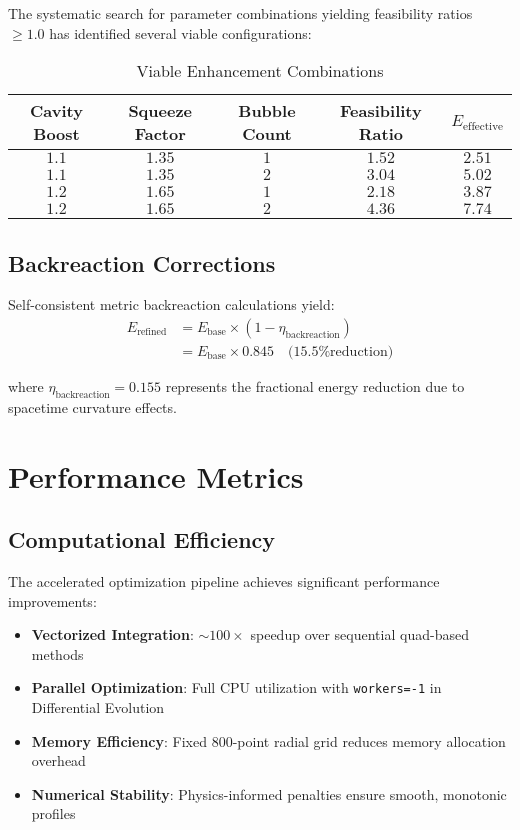 \documentclass[12pt]{article}
\begin{document}
The systematic search for parameter combinations yielding feasibility ratios $\geq 1.0$ has identified several viable configurations:

\begin{table}[ht]
\centering
\caption{Viable Enhancement Combinations}
\label{tab:enhancement_combinations}
\begin{tabular}{@{}ccccc@{}}
\toprule
\textbf{Cavity Boost} & \textbf{Squeeze Factor} & \textbf{Bubble Count} & \textbf{Feasibility Ratio} & \textbf{$E_{\text{effective}}$} \\
\midrule
$1.1$ & $1.35$ & $1$ & $1.52$ & $2.51$ \\
$1.1$ & $1.35$ & $2$ & $3.04$ & $5.02$ \\
$1.2$ & $1.65$ & $1$ & $2.18$ & $3.87$ \\
$1.2$ & $1.65$ & $2$ & $4.36$ & $7.74$ \\
\bottomrule
\end{tabular}
\end{table}

\subsection{Backreaction Corrections}

Self-consistent metric backreaction calculations yield:
\begin{align}
E_{\text{refined}} &= E_{\text{base}} \times (1 - \eta_{\text{backreaction}}) \\
&= E_{\text{base}} \times 0.845 \quad \text{(15.5\% reduction)}
\end{align}

where $\eta_{\text{backreaction}} = 0.155$ represents the fractional energy reduction due to spacetime curvature effects.

\section{Performance Metrics}

\subsection{Computational Efficiency}

The accelerated optimization pipeline achieves significant performance improvements:

\begin{itemize}
\item \textbf{Vectorized Integration}: $\sim100\times$ speedup over sequential quad-based methods
\item \textbf{Parallel Optimization}: Full CPU utilization with \texttt{workers=-1} in Differential Evolution
\item \textbf{Memory Efficiency}: Fixed 800-point radial grid reduces memory allocation overhead
\item \textbf{Numerical Stability}: Physics-informed penalties ensure smooth, monotonic profiles
\end{itemize}
\end{document}
